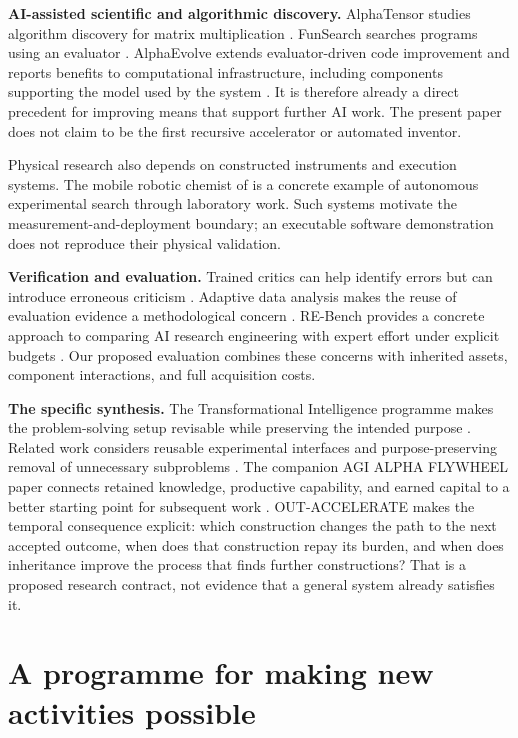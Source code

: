 \documentclass[11pt,letterpaper]{article}
\theoremstyle{remark}\newtheorem{remark}{Remark}[section]
\newcommand{\oa}{{\sffamily OUT-ACCELERATE}}
\begin{document}
\textbf{AI-assisted scientific and algorithmic discovery.}
AlphaTensor studies algorithm discovery for matrix multiplication \citep{fawzi2022}.
FunSearch searches programs using an evaluator \citep{romeraparedes2024}.
AlphaEvolve extends evaluator-driven code improvement and reports benefits to computational infrastructure, including components supporting the model used by the system \citep{novikov2025alphaevolve}.
It is therefore already a direct precedent for improving means that support further AI work.
The present paper does not claim to be the first recursive accelerator or automated inventor.

Physical research also depends on constructed instruments and execution systems.
The mobile robotic chemist of \citet{burger2020} is a concrete example of autonomous experimental search through laboratory work.
Such systems motivate the measurement-and-deployment boundary; an executable software demonstration does not reproduce their physical validation.

\textbf{Verification and evaluation.}
Trained critics can help identify errors but can introduce erroneous criticism \citep{mcaleese2024critics}.
Adaptive data analysis makes the reuse of evaluation evidence a methodological concern \citep{dwork2015holdout}.
RE-Bench provides a concrete approach to comparing AI research engineering with expert effort under explicit budgets \citep{wijk2025rebench}.
Our proposed evaluation combines these concerns with inherited assets, component interactions, and full acquisition costs.

\textbf{The specific synthesis.}
The Transformational Intelligence programme makes the problem-solving setup revisable while preserving the intended purpose \citep{boucher2026ti}.
Related work considers reusable experimental interfaces and purpose-preserving removal of unnecessary subproblems \citep{boucher2026world,boucher2026original}.
The companion AGI ALPHA FLYWHEEL paper connects retained knowledge, productive capability, and earned capital to a better starting point for subsequent work \citep{boucher2026flywheel}.
\oa{} makes the temporal consequence explicit: which construction changes the path to the next accepted outcome, when does that construction repay its burden, and when does inheritance improve the process that finds further constructions?
That is a proposed research contract, not evidence that a general system already satisfies it.

\section{A programme for making new activities possible}\label{sec:programme}
\end{document}
